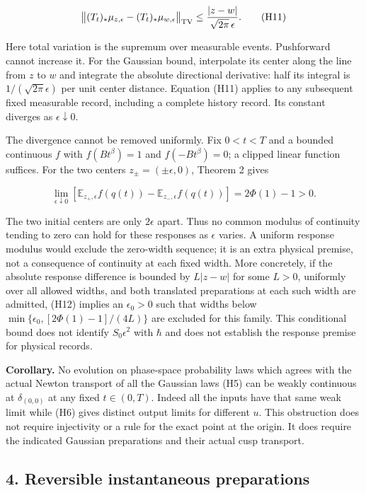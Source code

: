\documentclass[11pt,a4paper]{article}
\begin{document}
\[
 \bigl\|(T_t)_*\mu_{z,\epsilon}-(T_t)_*\mu_{w,\epsilon}\bigr\|_{\rm TV}
 \le \frac{|z-w|}{\sqrt{2\pi}\,\epsilon}. \tag{H11}
\]

Here total variation is the supremum over measurable events. Pushforward
cannot increase it. For the Gaussian bound, interpolate its center along
the line from \(z\) to \(w\) and integrate the absolute directional
derivative: half its integral is \(1/(\sqrt{2\pi}\epsilon)\) per unit
center distance. Equation (H11) applies to any subsequent fixed
measurable record, including a complete history record. Its constant
diverges as \(\epsilon\downarrow0\).

The divergence cannot be removed uniformly. Fix \(0<t<T\) and a bounded
continuous \(f\) with \(f(Bt^\beta)=1\) and \(f(-Bt^\beta)=0\); a
clipped linear function suffices. For the two centers
\(z_\pm=(\pm\epsilon,0)\), Theorem 2 gives

\[
 \lim_{\epsilon\downarrow0}
 \left[\mathbb E_{z_+,\epsilon}f(q(t))-
       \mathbb E_{z_-,\epsilon}f(q(t))\right]
 =2\Phi(1)-1>0. \tag{H12}
\]

The two initial centers are only \(2\epsilon\) apart. Thus no common
modulus of continuity tending to zero can hold for these responses as
\(\epsilon\) varies. A uniform response modulus would exclude the
zero-width sequence; it is an extra physical premise, not a consequence
of continuity at each fixed width. More concretely, if the absolute
response difference is bounded by \(L|z-w|\) for some \(L>0\), uniformly
over all allowed widths, and both translated preparations at each such
width are admitted, (H12) implies an \(\epsilon_0>0\) such that widths
below \(\min\{\epsilon_0,[2\Phi(1)-1]/(4L)\}\) are excluded for this
family. This conditional bound does not identify \(S_0\epsilon^2\) with
\(\hbar\) and does not establish the response premise for physical
records.

\textbf{Corollary.} No evolution on phase-space probability laws which
agrees with the actual Newton transport of all the Gaussian laws (H5)
can be weakly continuous at \(\delta_{(0,0)}\) at any fixed
\(t\in(0,T)\). Indeed all the inputs have that same weak limit while
(H6) gives distinct output limits for different \(u\). This obstruction
does not require injectivity or a rule for the exact point at the
origin. It does require the indicated Gaussian preparations and their
actual cusp transport.

\hypertarget{reversible-instantaneous-preparations}{%
\subsection{4. Reversible instantaneous
preparations}\label{reversible-instantaneous-preparations}}
\end{document}
